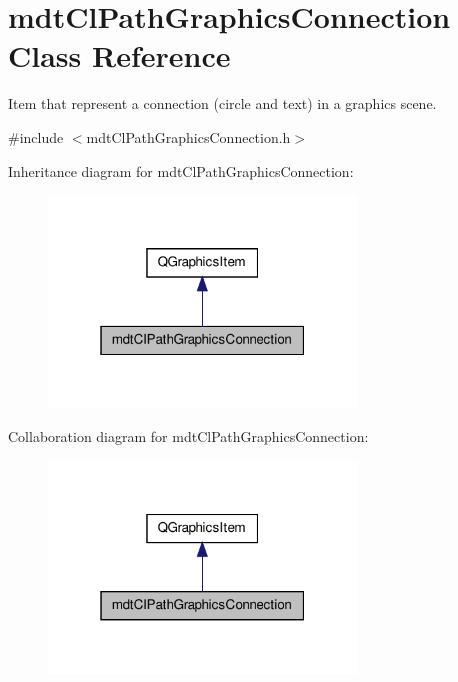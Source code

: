\hypertarget{classmdt_cl_path_graphics_connection}{\section{mdt\-Cl\-Path\-Graphics\-Connection Class Reference}
\label{classmdt_cl_path_graphics_connection}
}


Item that represent a connection (circle and text) in a graphics scene.  




{\ttfamily \#include $<$mdt\-Cl\-Path\-Graphics\-Connection.\-h$>$}



Inheritance diagram for mdt\-Cl\-Path\-Graphics\-Connection\-:\nopagebreak
\begin{figure}[H]
\begin{center}
\leavevmode
\includegraphics[width=232pt]{classmdt_cl_path_graphics_connection__inherit__graph}
\end{center}
\end{figure}


Collaboration diagram for mdt\-Cl\-Path\-Graphics\-Connection\-:\nopagebreak
\begin{figure}[H]
\begin{center}
\leavevmode
\includegraphics[width=232pt]{classmdt_cl_path_graphics_connection__coll__graph}
\end{center}
\end{figure}
